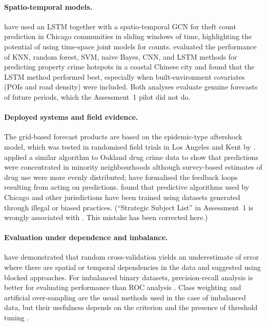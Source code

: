 \documentclass[11pt,a4paper]{report}
\begin{document}
\paragraph{Spatio-temporal models.} \citet{han2020} have used an LSTM together with a spatio-temporal GCN for theft count prediction in Chicago communities in sliding windows of time, highlighting the potential of using time-space joint models for counts. \citet{zhang2020} evaluated the performance of KNN, random forest, SVM, naive Bayes, CNN, and LSTM methods for predicting property crime hotspots in a coastal Chinese city and found that the LSTM method performed best, especially when built-environment covariates (POIs and road density) were included. Both analyses evaluate genuine forecasts of future periods, which the Assessment~1 pilot did not do.


\paragraph{Deployed systems and field evidence.} The grid-based forecast products are based on the epidemic-type aftershock model, which was tested in randomised field trials in Los Angeles and Kent by \citet{mohler2015}. \citet{lum2016} applied a similar algorithm to Oakland drug crime data to show that predictions were concentrated in minority neighbourhoods although survey-based estimates of drug use were more evenly distributed; \citet{ensign2018} have formalised the feedback loops resulting from acting on predictions. \citet{richardson2019} found that predictive algorithms used by Chicago and other jurisdictions have been trained using datasets generated through illegal or biased practices. (``Strategic Subject List'' in Assessment~1 is wrongly associated with \citet{lum2016}. This mistake has been corrected here.)


\paragraph{Evaluation under dependence and imbalance.} \citet{roberts2017} have demonstrated that random cross-validation yields an underestimate of error where there are spatial or temporal dependencies in the data and suggested using blocked approaches. For imbalanced binary datasets, precision-recall analysis is better for evaluating performance than ROC analysis \citep{davis2006,saito2015}. Class weighting and artificial over-sampling \citep{chawla2002} are the usual methods used in the case of imbalanced data, but their usefulness depends on the criterion and the presence of threshold tuning \citep{he2009}.
\end{document}
